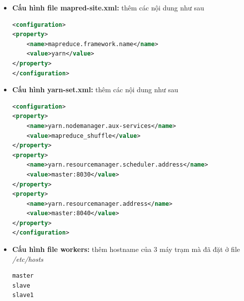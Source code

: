 \begin{enumerate}
\begin{itemize}
				\item \textbf{Cấu hình file mapred-site.xml: }thêm các nội dung như sau
				\begin{lstlisting}[language=XML]
<configuration>
<property>
	<name>mapreduce.framework.name</name>
	<value>yarn</value>
</property>
</configuration>
				\end{lstlisting}
				\item \textbf{Cấu hình yarn-set.xml: }thêm các nội dung như sau
				\begin{lstlisting}[language=XML]
<configuration>
<property>
	<name>yarn.nodemanager.aux-services</name>
	<value>mapreduce_shuffle</value>
</property>
<property>
	<name>yarn.resourcemanager.scheduler.address</name>
	<value>master:8030</value>
</property>
<property>
	<name>yarn.resourcemanager.address</name>
	<value>master:8040</value>
</property>
</configuration>
				\end{lstlisting}
				\item \textbf{Cấu hình file workers: }thêm hostname của 3 máy trạm mà đã đặt ở file \textit{/etc/hosts}
				\begin{lstlisting}
master
slave
slave1
				\end{lstlisting}
			\end{itemize}
			
			
			
		\end{enumerate}
		
